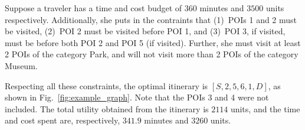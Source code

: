 Suppose a traveler has a time and cost budget of $360$ minutes and $3500$ units respectively.
Additionally, she puts in the contraints that (1)~POIs 1 and 2 must be visited, (2)~POI 2 must be visited before POI 1, and (3)~POI 3, if visited, must be before both POI 2 and POI 5 (if visited).
Further, she must visit at least 2 POIs of the category Park, and will not visit more than 2 POIs of the category Museum.

Respecting all these constraints, the optimal itinerary is $[S, 2, 5, 6, 1, D]$, as shown in Fig.~\ref{fig:example_graph}.  Note that the
POIs 3 and 4 were not included.  The total utility obtained from the
itinerary is $2114$ units, and the time and cost spent 
are, respectively, $341.9$ minutes and $3260$ units.


